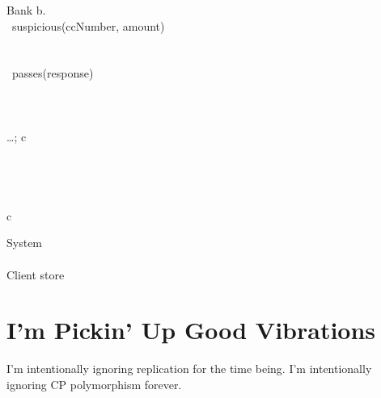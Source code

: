 \documentclass[orivec,envcountsame]{llncs}
\begin{document}
\begin{code}
Bank  \lambda b. \bl
   \\
  \ suspicious(ccNumber, amount)\  \\
  \quad\bl
     \\
     \\
    \ passes(response)\  \\
    \quad \bl
       \\
       \\
       \\
      \dots; c \el \\
     \\
    \quad \bl
       \\
       \\
       \\
      c \el
  \el
\el
\end{code}

\begin{code}
System  \bl
   \\
   \\
  Client \app store
\el
\end{code}

\section{I'm Pickin' Up Good Vibrations}

I'm intentionally ignoring replication for the time being.  I'm intentionally ignoring CP
polymorphism forever.
\end{document}
